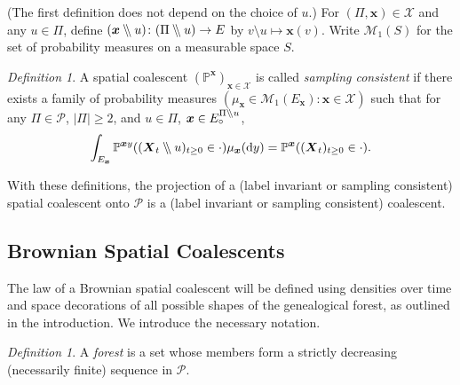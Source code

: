\documentclass[reqno,draft]{amsart}
\numberwithin{equation}{section}
\theoremstyle{plain}
\theoremstyle{remark}
\newtheorem{definition}[theorem]{Definition}
\newcommand{\N}{\mathbb{N}} %
\renewcommand{\P}{\mathbb{P}} %
\newcommand*\diff{\mathop{}\!\mathrm{d}}
\newcommand{\fpart}{\Pi} %
\newcommand{\wo}{\mathbin{{\setminus}\mspace{-5mu}{\setminus}}}
\begin{document}
(The first definition does not depend on the choice of $u$.)
For $(\fpart,\boldsymbol x) \in \mathcal{X}$ and any $u\in \fpart$, define $(\boldsymbol x \wo u)\colon (\fpart \wo u) \to E$ by $v \setminus u \mapsto \boldsymbol x(v)$. Write $\mathcal{M}_1(S)$ for the set of probability measures on a measurable space $S$.
\begin{definition}\label{def:samplingcon}
    A spatial coalescent $(\P^{\boldsymbol x})_{\boldsymbol x\in \mathcal{X}}$ is called \emph{sampling consistent} if there exists a family of probability measures $(\mu_{\boldsymbol x} \in \mathcal{M}_1(E_{\boldsymbol x})\colon \boldsymbol x\in \mathcal{X})$ such that
    for any $\fpart \in \mathcal{P}$, $|\fpart| \ge 2$, and $u\in \fpart$, $\boldsymbol x\in E^{\fpart\wo u}_\circ $,
    \begin{align}\label{eq:samplingcon}
        \int_{E_{\boldsymbol x}} \P^{\boldsymbol x y}((\boldsymbol X_t \wo u)_{t\ge 0} \in \cdot ) \mu_{\boldsymbol x}(\diff y) = \P^{\boldsymbol x}((\boldsymbol X_t)_{t\ge 0} \in \cdot ).
    \end{align}
\end{definition}

With these definitions, the projection of a (label invariant or sampling consistent) spatial coalescent onto $\mathcal{P}$ is a (label invariant or sampling consistent) coalescent.


\subsection{Brownian Spatial Coalescents}
The law of a Brownian spatial coalescent will be defined using densities over time and space decorations of all possible shapes of the genealogical forest, as outlined in the introduction. We introduce the necessary notation.

\begin{definition}\label{def:forest}
    A \emph{forest} is a set whose members form a strictly decreasing (necessarily finite) sequence in $\mathcal{P}$.
\end{definition}
\end{document}
